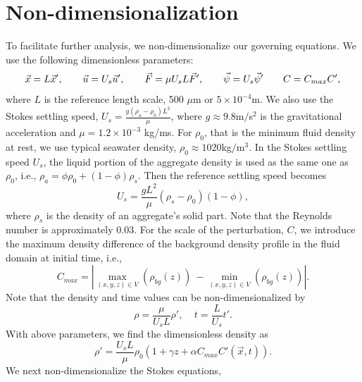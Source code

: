 \section{Non-dimensionalization}
To facilitate further analysis, we non-dimensionalize our governing equations. We use the following dimensionless parameters:
\[
\vec{x} = L \vec{x}',
\hspace{7mm}
\vec{u} =  U_s \vec{u}',
\hspace{7mm}
\vec{F} = \mu U_s L  \vec{F}',
\hspace{7mm}
\vec{\psi} = U_s \vec{\psi}'
\hspace{7mm}
C= C_{max} C'
,
\]
 where $L$ is the reference length scale, 500 $\mu$m or $5 \times 10^{-4}$m.
 We also use the Stokes settling speed, $U_s = \frac{g (\rho_a - \rho_0) L^2}{\mu}$, where $g \approx 9.8$m$/$s$^2$ is the gravitational acceleration and $\mu = 1.2 \times 10^{-3}$ kg/ms.
For $\rho_0$, that is the minimum fluid density at rest, we use typical seawater density, $\rho_0 \approx 1020$kg$/$m$^3$.
In the Stokes settling speed $U_s$, the liquid portion of the aggregate density is used as the same one as $\rho_0$, i.e., $\rho_a = \phi \rho_0 + (1-\phi) \rho_s $. Then the reference settling speed becomes 
\[
U_s = \frac{g  L^2}{\mu}(\rho_s - \rho_0)(1-\phi),
\] 
where $\rho_s$ is the density of an aggregate's solid part. 
Note that the Reynolds number is approximately 0.03.
For the scale of the perturbation, $C$, we introduce the maximum density difference of the background density profile in the fluid domain at initial time, i.e., 
\[
C_{max} = 
\left|
\max_{(x,y,z) \in V} \left(\rho_{bg}(z)  \right)
\ - \min_{(x,y,z) \in V} \left(\rho_{bg}(z)  \right) \right|.
\] 
Note that the density and time values can be non-dimensionalized by
\[
\rho = \frac{\mu  }{{U_s} L}  \rho', 
\ \ \ \ \ 
t = \frac{L}{U_s}t'.
\]
With above parameters, we find the dimensionless density as
\begin{equation}
	\rho' = \frac{U_s L }{\mu}\rho_0 \left( 1 + \gamma z  + \alpha C_{max} C'(\vec{x},t) \right).
\end{equation}
We next non-dimensionalize the Stokes equations,
